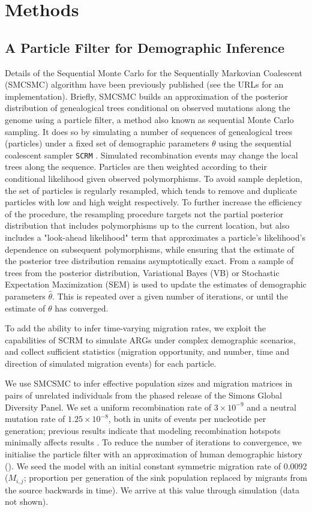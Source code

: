 \section{Methods}

\subsection{A Particle Filter for Demographic Inference} Details of the Sequential Monte Carlo for the Sequentially Markovian Coalescent (SMCSMC) algorithm have been previously published \cite{Henderson2018} (see the URLs for an implementation). 
Briefly, SMCSMC builds an approximation of the posterior distribution of genealogical trees conditional on observed mutations along the genome using a particle filter, a method also known as sequential Monte Carlo sampling. It does so by simulating a number of sequences of genealogical trees (particles) under a fixed set of demographic parameters $\theta$ using the sequential coalescent sampler {\tt SCRM} \cite{Staab2015}. Simulated recombination events may change the local trees along the sequence. Particles are then weighted according to their conditional likelihood given observed polymorphisms.  To avoid sample depletion, the set of particles is regularly resampled, which tends to remove and duplicate particles with low and high weight respectively.  To further increase the efficiency of the procedure, the resampling procedure targets not the partial posterior distribution that includes polymorphisms up to the current location, but also includes a "look-ahead likelihood" term that approximates a particle's likelihood's dependence on subsequent polymorphisms, while ensuring that the estimate of the posterior tree distribution remains asymptotically exact.  From a sample of trees from the posterior distribution, Variational Bayes (VB) or Stochastic Expectation Maximization (SEM) is used to update the estimates of demographic parameters $\hat{\theta}$. This is repeated over a given number of iterations, or until the estimate of $\theta$ has converged.

To add the ability to infer time-varying migration rates, we exploit the capabilities of SCRM to simulate ARGs under complex demographic scenarios, and collect sufficient statistics (migration opportunity, and number, time and direction of simulated migration events) for each particle. 

We use SMCSMC to infer effective population sizes and migration matrices in pairs of unrelated individuals from the phased release of the Simons Global Diversity Panel. We set a uniform recombination rate of $3\times10^{-9}$ and a neutral mutation rate of $1.25\times10^{-8}$, both in units of events per nucleotide per generation; previous results indicate that modeling recombination
hotspots minimally affects results \cite{Li2011}. To reduce the number of iterations to convergence, we initialise the particle filter with an approximation of human demographic history ().
We seed the model with an initial constant symmetric  migration rate of 0.0092 ($M_{i,j}$; proportion per generation of the sink population replaced by migrants from the source backwards in time). We arrive at this value through simulation (data not shown).

